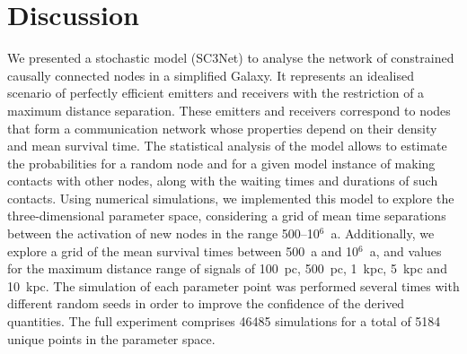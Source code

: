 \documentclass[crop]{CSLB}
\begin{document}


\section{Discussion}\label{S_discussion}

We presented a stochastic model (SC3Net) to analyse the network of
constrained causally connected nodes in a simplified Galaxy.
%
It represents an idealised scenario of perfectly efficient emitters and
receivers with the restriction of a maximum distance separation.
%
These emitters and receivers correspond to nodes that form a
communication network whose properties depend on their density
and mean survival time.
%
The statistical analysis of the model allows to estimate the
probabilities for a random node and for a given model instance of
making contacts with other nodes, along with the waiting times and
durations of such contacts.
%
Using numerical simulations, we implemented this model to explore the
three-dimensional parameter space, considering a grid of mean time
separations between the activation of new nodes
in the range 500--10$^6$~a.
%
Additionally, we explore a grid of the mean survival times between 
500~a and 10$^6$~a, and values for the maximum distance range of signals 
of 100~pc, 500~pc, 1~kpc, 5~kpc and 10~kpc.
%
The simulation of each parameter point was performed several times
with different random seeds in order to improve the confidence of the
derived quantities.
%
The full experiment comprises 46485 simulations for a total of 5184
unique points in the parameter space.



\end{document}
